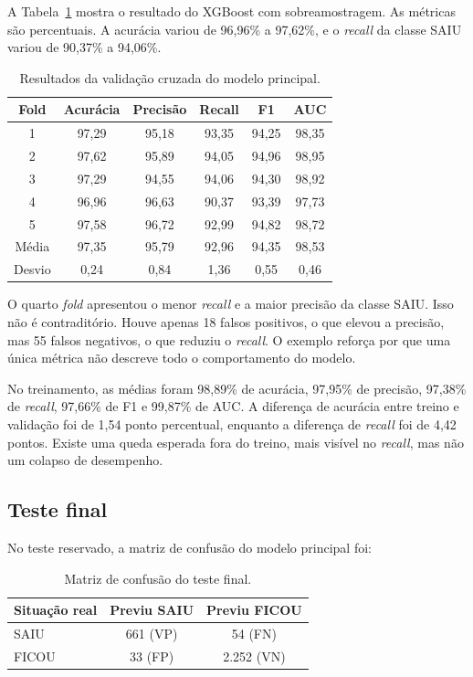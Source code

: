 \documentclass[12pt]{article}
\begin{document}
A Tabela~\ref{tab:folds} mostra o resultado do XGBoost com sobreamostragem. As métricas são percentuais. A acurácia variou de 96,96\% a 97,62\%, e o \textit{recall} da classe SAIU variou de 90,37\% a 94,06\%.

\begin{table}[ht]
\centering
\caption{Resultados da validação cruzada do modelo principal.}
\label{tab:folds}
\small
\begin{tabular}{cccccc}
\toprule
Fold & Acurácia & Precisão & Recall & F1 & AUC \\
\midrule
1 & 97,29 & 95,18 & 93,35 & 94,25 & 98,35 \\
2 & 97,62 & 95,89 & 94,05 & 94,96 & 98,95 \\
3 & 97,29 & 94,55 & 94,06 & 94,30 & 98,92 \\
4 & 96,96 & 96,63 & 90,37 & 93,39 & 97,73 \\
5 & 97,58 & 96,72 & 92,99 & 94,82 & 98,72 \\
\midrule
Média & 97,35 & 95,79 & 92,96 & 94,35 & 98,53 \\
Desvio & 0,24 & 0,84 & 1,36 & 0,55 & 0,46 \\
\bottomrule
\end{tabular}
\end{table}

O quarto \textit{fold} apresentou o menor \textit{recall} e a maior precisão da classe SAIU. Isso não é contraditório. Houve apenas 18 falsos positivos, o que elevou a precisão, mas 55 falsos negativos, o que reduziu o \textit{recall}. O exemplo reforça por que uma única métrica não descreve todo o comportamento do modelo.

No treinamento, as médias foram 98,89\% de acurácia, 97,95\% de precisão, 97,38\% de \textit{recall}, 97,66\% de F1 e 99,87\% de AUC. A diferença de acurácia entre treino e validação foi de 1,54 ponto percentual, enquanto a diferença de \textit{recall} foi de 4,42 pontos. Existe uma queda esperada fora do treino, mais visível no \textit{recall}, mas não um colapso de desempenho.

\subsection{Teste final}

No teste reservado, a matriz de confusão do modelo principal foi:

\begin{table}[ht]
\centering
\caption{Matriz de confusão do teste final.}
\label{tab:matrizteste}
\begin{tabular}{lcc}
\toprule
Situação real & Previu SAIU & Previu FICOU \\
\midrule
SAIU & 661 (VP) & 54 (FN) \\
FICOU & 33 (FP) & 2.252 (VN) \\
\bottomrule
\end{tabular}
\end{table}
\end{document}
